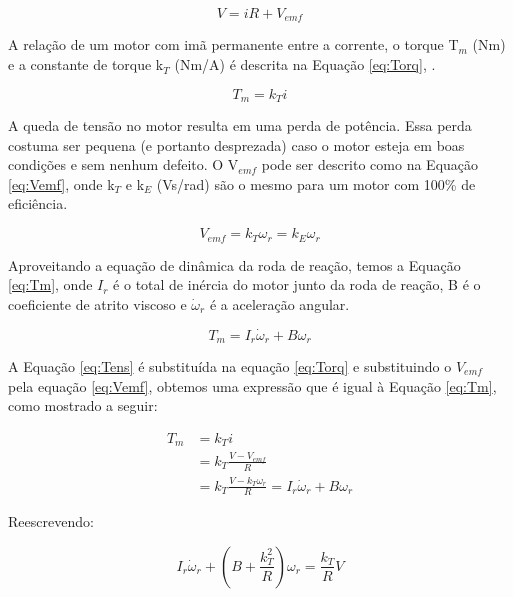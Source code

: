 \documentclass[
	12pt,				%
	openany,			%
	twoside,			%
	a4paper,			%
	english,			%
	french,				%
	spanish,			%
	brazil,				%
	oldfontcommands
	]{abntex2}
\begin{document}
\begin{equation}
V = i R + V_{emf}
\label{eq:Tens}
\end{equation}

A relação de um motor com imã permanente entre a corrente, o torque T$_{m}$ (Nm) e a constante de torque k$_{T}$ (Nm/A) é descrita na Equação \ref{eq:Torq},  .

\begin{equation}
T_{m} = k_{T} i
\label{eq:Torq}
\end{equation}

A queda de tensão no motor resulta em uma perda de potência. Essa perda costuma ser pequena (e portanto desprezada) caso o motor esteja em boas condições e sem nenhum defeito. O V$_{emf}$ pode ser descrito como na Equação \ref{eq:Vemf}, onde k$_{T}$ e k$_{E}$ (Vs/rad) são o mesmo para um motor com 100\% de eficiência.

\begin{equation}
V_{emf} = k_{T} \omega_{r} = k_{E} \omega_{r}
\label{eq:Vemf}
\end{equation}

Aproveitando a equação de dinâmica da roda de reação, temos a Equação \ref{eq:Tm}, onde $I_{r}$ é o total de inércia do motor junto da roda de reação, B é o coeficiente de atrito viscoso e $\dot{\omega}_{r}$ é a aceleração angular.

\begin{equation}
T_{m} = I_{r} \dot{\omega}_{r} + B \omega_{r}
\label{eq:Tm}
\end{equation}

A Equação \ref{eq:Tens} é substituída na equação \ref{eq:Torq} e substituindo o $V_{emf}$ pela equação \ref{eq:Vemf}, obtemos uma expressão que é igual à Equação \ref{eq:Tm}, como mostrado a seguir:

\begin{align}
	T_{m} & = k_{T} i \nonumber \\
	& = k_{T} \frac{V - V_{emf}}{R} \nonumber \\
	& = k_{T} \frac{ V - k_{T} \omega_{r} }{R} = I_{r} \dot{\omega}_{r} + B \omega_{r}
\label{eq:Subst}
\end{align}

Reescrevendo:

\begin{equation}
I_{r} \dot{\omega}_{r} + \left( B + \frac{k_{T}^{2}}{R} \right) \omega_{r} = \frac{k_{T}}{R} V \nonumber
\label{eq:ReWrite}
\end{equation}
\end{document}
